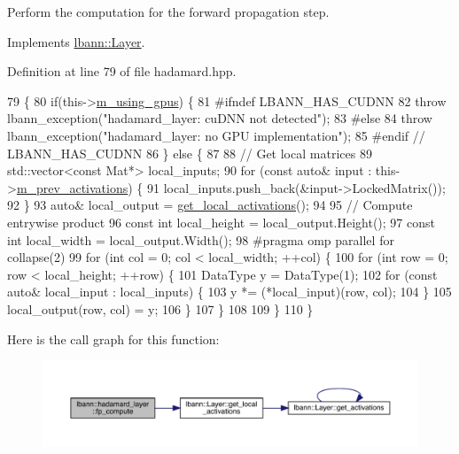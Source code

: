 Perform the computation for the forward propagation step. 

Implements \hyperlink{classlbann_1_1Layer_a523319dd1bd87a0612afa1912bb5aad7}{lbann\+::\+Layer}.



Definition at line 79 of file hadamard.\+hpp.


\begin{DoxyCode}
79                              \{
80     \textcolor{keywordflow}{if}(this->\hyperlink{classlbann_1_1Layer_af7881cb5eff5207c15fa835d65462e8f}{m\_using\_gpus}) \{
81 \textcolor{preprocessor}{  #ifndef LBANN\_HAS\_CUDNN}
82       \textcolor{keywordflow}{throw} lbann\_exception(\textcolor{stringliteral}{"hadamard\_layer: cuDNN not detected"});
83 \textcolor{preprocessor}{  #else}
84       \textcolor{keywordflow}{throw} lbann\_exception(\textcolor{stringliteral}{"hadamard\_layer: no GPU implementation"});
85 \textcolor{preprocessor}{  #endif // LBANN\_HAS\_CUDNN}
86     \} \textcolor{keywordflow}{else} \{
87 
88       \textcolor{comment}{// Get local matrices}
89       std::vector<const Mat*> local\_inputs;
90       \textcolor{keywordflow}{for} (\textcolor{keyword}{const} \textcolor{keyword}{auto}& input : this->\hyperlink{classlbann_1_1Layer_a52314601c3458268f56e017dc2ade357}{m\_prev\_activations}) \{
91         local\_inputs.push\_back(&input->LockedMatrix());
92       \}
93       \textcolor{keyword}{auto}& local\_output = \hyperlink{classlbann_1_1Layer_a4248f27acebf72b7b7b3ee39c8bcb62a}{get\_local\_activations}();
94 
95       \textcolor{comment}{// Compute entrywise product}
96       \textcolor{keyword}{const} \textcolor{keywordtype}{int} local\_height = local\_output.Height();
97       \textcolor{keyword}{const} \textcolor{keywordtype}{int} local\_width = local\_output.Width();
98 \textcolor{preprocessor}{      #pragma omp parallel for collapse(2)}
99       \textcolor{keywordflow}{for} (\textcolor{keywordtype}{int} col = 0; col < local\_width; ++col) \{
100         \textcolor{keywordflow}{for} (\textcolor{keywordtype}{int} row = 0; row < local\_height; ++row) \{
101           DataType y = DataType(1);
102           \textcolor{keywordflow}{for} (\textcolor{keyword}{const} \textcolor{keyword}{auto}& local\_input : local\_inputs) \{
103             y *= (*local\_input)(row, col);
104           \}
105           local\_output(row, col) = y;
106         \}
107       \}
108 
109     \}
110   \}
\end{DoxyCode}
Here is the call graph for this function\+:\nopagebreak
\begin{figure}[H]
\begin{center}
\leavevmode
\includegraphics[width=350pt]{classlbann_1_1hadamard__layer_a8be44f24f2290b06b104294d1fe31d41_cgraph}
\end{center}
\end{figure}
